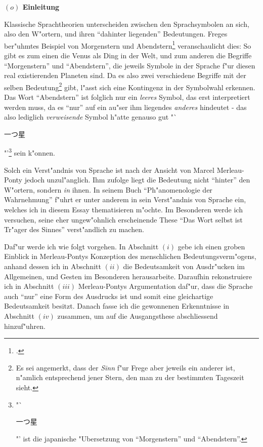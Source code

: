 \documentclass[a4paper, 12pt]{article}
\begin{document}
\begin{onehalfspace} 

\noindent\textbf{$(o)$ Einleitung}

\noindent Klassische Sprachtheorien unterscheiden zwischen den Sprachsymbolen an sich, also den W"ortern, und ihren "`dahinter liegenden"' Bedeutungen. Freges ber"uhmtes Beispiel von Morgenstern und Abendstern\footnote{\cite{sinnundbedeutung}.} veranschaulicht dies: So gibt es zum einen die Venus als Ding in der Welt, und zum anderen die Begriffe "`Morgenstern"' und "`Abendstern"', die jeweils Symbole in der Sprache f"ur diesen real existierenden Planeten sind. Da es also zwei verschiedene Begriffe mit der selben Bedeutung\footnote{Es sei angemerkt, dass der \emph{Sinn} f"ur Frege aber jeweils ein anderer ist, n"amlich entsprechend jener Stern, den man zu der bestimmten Tageszeit sieht.} gibt, l"asst sich eine Kontingenz in der Symbolwahl erkennen. Das Wort "`Abendstern"' ist folglich nur ein \emph{leeres} Symbol, das erst interpretiert werden muss, da es "`nur"' auf ein au"ser ihm liegendes \emph{anderes} hindeutet - das also lediglich \emph{verweisende} Symbol h"atte genauso gut "`\begin{CJK}{UTF8}{min}一つ星\end{CJK}"'\footnote{"`\begin{CJK}{UTF8}{min}一つ星\end{CJK}"' ist die japanische "Ubersetzung von "`Morgenstern"' und "`Abendstern"'.} sein k"onnen.

Solch ein Verst"andnis von Sprache ist nach der Ansicht von Marcel Merleau-Ponty jedoch unzul"anglich. Ihm zufolge liegt die Bedeutung nicht "`hinter"' den W"ortern, sondern \emph{in} ihnen. In seinem Buch "`Ph"anomenologie der Wahrnehmung"' \citep{merleau1966phanomenologie} f"uhrt er unter anderem in sein Verst"andnis von Sprache ein, welches ich in diesem Essay thematisieren m"ochte. Im Besonderen werde ich versuchen, seine eher ungew"ohnlich erscheinende These "`Das Wort selbst ist Tr"ager des Sinnes"' verst"andlich zu machen.\newline

Daf"ur werde ich wie folgt vorgehen. In Abschnitt $(i)$ gebe ich einen groben Einblick in Merleau-Pontys Konzeption des menschlichen Bedeutungsverm"ogens, anhand dessen ich in Abschnitt $(ii)$ die Bedeutsamkeit von Ausdr"ucken im Allgemeinen, und Gesten im Besonderen herausarbeite. Daraufhin rekonstruiere ich in Abschnitt $(iii)$ Merleau-Pontys Argumentation daf"ur, dass die Sprache auch "`nur"' eine Form des Ausdrucks ist und somit eine gleichartige Bedeutsamkeit besitzt. Danach fasse ich die gewonnenen Erkenntnisse in Abschnitt $(iv)$ zusammen, um auf die Ausgangsthese abschliessend hinzuf"uhren.


\end{onehalfspace}
\end{document}
